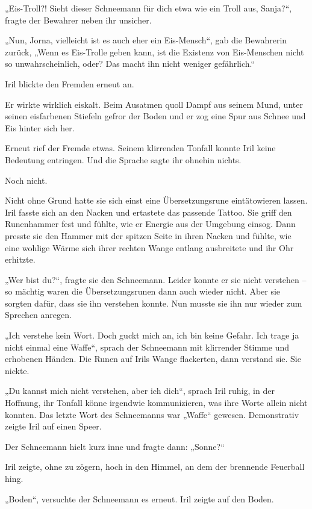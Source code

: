 „Eis-Troll?! Sieht dieser Schneemann für dich etwa wie ein Troll aus, Sanja?“, fragte der Bewahrer neben ihr unsicher.

„Nun, Jorna, vielleicht ist es auch eher ein Eis-Mensch“, gab die Bewahrerin zurück, „Wenn es Eis-Trolle geben kann, ist die Existenz von Eis-Menschen nicht so unwahrscheinlich, oder? Das macht ihn nicht weniger gefährlich.“

Iril blickte den Fremden erneut an.

Er wirkte wirklich eiskalt. Beim Ausatmen quoll Dampf aus seinem Mund, unter seinen eisfarbenen Stiefeln gefror der Boden und er zog eine Spur aus Schnee und Eis hinter sich her.

Erneut rief der Fremde etwas. Seinem klirrenden Tonfall konnte Iril keine Bedeutung entringen. Und die Sprache sagte ihr ohnehin nichts.

Noch nicht.

Nicht ohne Grund hatte sie sich einst eine Übersetzungsrune eintätowieren lassen. Iril fasste sich an den Nacken und ertastete das passende Tattoo. Sie griff den Runenhammer fest und fühlte, wie er Energie aus der Umgebung einsog. Dann presste sie den Hammer mit der spitzen Seite in ihren Nacken und fühlte, wie eine wohlige Wärme sich ihrer rechten Wange entlang ausbreitete und ihr Ohr erhitzte.

„Wer bist du?“, fragte sie den Schneemann. Leider konnte er sie nicht verstehen – so mächtig waren die Übersetzungsrunen dann auch wieder nicht. Aber sie sorgten dafür, dass sie ihn verstehen konnte. Nun musste sie ihn nur wieder zum Sprechen anregen.

„Ich verstehe kein Wort. Doch guckt mich an, ich bin keine Gefahr. Ich trage ja nicht einmal eine Waffe“, sprach der Schneemann mit klirrender Stimme und erhobenen Händen. Die Runen auf Irils Wange flackerten, dann verstand sie. Sie nickte.

„Du kannst mich nicht verstehen, aber ich dich“, sprach Iril ruhig, in der Hoffnung, ihr Tonfall könne irgendwie kommunizieren, was ihre Worte allein nicht konnten. Das letzte Wort des Schneemanns war „Waffe“ gewesen. Demonstrativ zeigte Iril auf einen Speer.

Der Schneemann hielt kurz inne und fragte dann: „Sonne?“

Iril zeigte, ohne zu zögern, hoch in den Himmel, an dem der brennende Feuerball hing.

„Boden“, versuchte der Schneemann es erneut. Iril zeigte auf den Boden.

